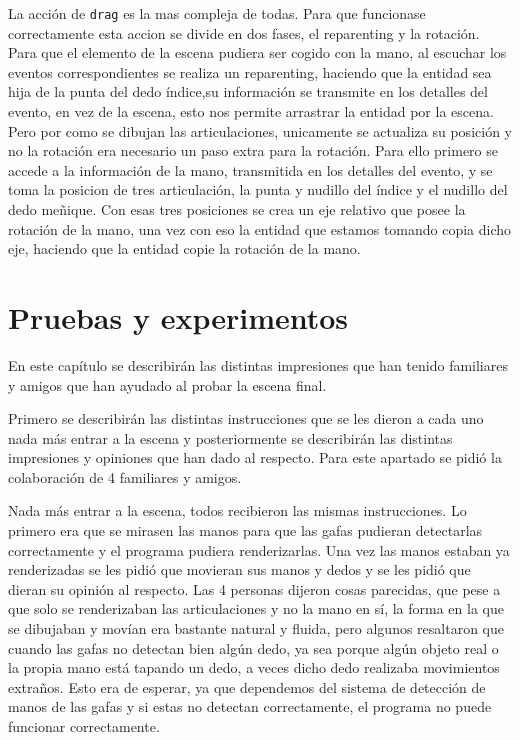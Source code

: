 \documentclass[a4paper, 12pt]{book}
\begin{document}
La acción de \texttt{drag} es la mas compleja de todas. Para que funcionase correctamente esta accion se divide en dos fases, el reparenting y la rotación. Para que el elemento de la escena pudiera ser cogido con la mano, al escuchar los eventos correspondientes se realiza un reparenting, haciendo que la entidad sea hija de la punta del dedo índice,su información se transmite en los detalles del evento, en vez de la escena, esto nos permite arrastrar la entidad por la escena. Pero por como se dibujan las articulaciones, unicamente se actualiza su posición y no la rotación era necesario un paso extra para la rotación.
Para ello primero se accede a la información de la mano, transmitida en los detalles del evento, y se toma la posicion de tres articulación, la punta y nudillo del índice y el nudillo del dedo meñique. Con esas tres posiciones se crea un eje relativo que posee la rotación de la mano, una vez con eso la entidad que estamos tomando copia dicho eje, haciendo que la entidad copie la rotación de la mano.

\cleardoublepage
\chapter{Pruebas y experimentos}
\label{chap:pruebas-experimentos}
En este capítulo se describirán las distintas impresiones que han tenido familiares y amigos que han ayudado al probar la escena final. 

Primero se describirán las distintas instrucciones que se les dieron a cada uno nada más entrar a la escena y posteriormente se describirán las distintas impresiones y opiniones que han dado al respecto.
Para este apartado se pidió la colaboración de 4 familiares y amigos.

Nada más entrar a la escena, todos recibieron las mismas instrucciones. Lo primero era que se mirasen las manos para que las gafas pudieran detectarlas correctamente y el programa pudiera renderizarlas. Una vez las manos estaban ya renderizadas se les pidió que movieran sus manos y dedos y se les pidió que dieran su opinión al respecto. 
Las 4 personas dijeron cosas parecidas, que pese a que solo se renderizaban las articulaciones y no la mano en sí, la forma en la que se dibujaban y movían era bastante natural y fluida, pero algunos resaltaron que cuando las gafas no detectan bien algún dedo, ya sea porque algún objeto real o la propia mano está tapando un dedo, a veces dicho dedo realizaba movimientos extraños. 
Esto era de esperar, ya que dependemos del sistema de detección de manos de las gafas y si estas no detectan correctamente, el programa no puede funcionar correctamente. 
\end{document}
